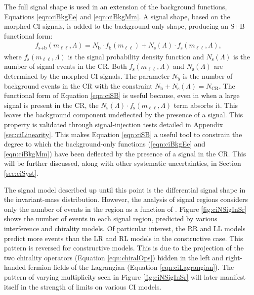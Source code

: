 The full signal shape is used in an extension of the background functions, Equations \ref{eqn:ciBkgEe} and \ref{eqn:ciBkgMm}.
A signal shape, based on the morphed CI signals, is added to the background-only shape, producing an S+B functional form:
\begin{align}
\label{eqn:ciSB}
f_\textrm{s+b}(m_{\ell\ell},\Lambda) = N_\textrm{b}\cdot f_\textrm{b}(m_{\ell\ell}) + N_\textrm{s}(\Lambda)\cdot f_\textrm{s}(m_{\ell\ell},\Lambda),
\end{align}
where $f_\textrm{s}(m_{\ell\ell},\Lambda)$ is the signal probability density function and $N_\textrm{s}(\Lambda)$ is the number of signal events in the CR.
Both $f_\textrm{s}(m_{\ell\ell},\Lambda)$ and $N_\textrm{s}(\Lambda)$ are determined by the morphed CI signals.
The parameter $N_\textrm{b}$ is the number of background events in the CR with the constraint $N_\textrm{b}+N_\textrm{s}(\Lambda)=N_\textrm{CR}$.
The functional form of Equation \ref{eqn:ciSB} is useful because, even in when a large signal is present in the CR, the $N_\textrm{s}(\Lambda)\cdot f_\textrm{s}(m_{\ell\ell},\Lambda)$ term absorbs it.
This leaves the background component undeflected by the presence of a signal.
This property is validated through signal-injection tests detailed in Appendix \ref{sec:ciLinearity}.
This makes Equation \ref{eqn:ciSB} a useful tool to constrain the degree to which the background-only functions (\ref{eqn:ciBkgEe} and \ref{eqn:ciBkgMm}) have been deflected by the presence of a signal in the CR.
This will be further discussed, along with other systematic uncertainties, in Section \ref{sec:ciSyst}.

The signal model described up until this point is the differential signal shape in the invariant-mass distribution.
However, the analysis of signal regions considers only the number of events in the region as a function of \lam.
Figure \ref{fig:ciNSigInSr} shows the number of events in each signal region, predicted by various interference and chirality models.
Of particular interest, the RR and LL models predict more events than the LR and RL models in the constructive case.
This pattern is reversed for constructive models.
This is due to the projection of the two chirality operators (Equation \ref{eqn:chiralOps}) hidden in the left and right-handed fermion fields of the Lagrangian (Equation \ref{eqn:ciLagrangian}).
The pattern of varying multiplicity seen in Figure \ref{fig:ciNSigInSr} will later manifest itself in the strength of limits on various CI models.

